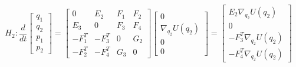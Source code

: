 \documentclass{article}
\begin{document}
\[
H_2 : \frac{d}{dt}
\left[
\begin{array}{ccc}
q_1 \\
q_2 \\
p_1 \\
p_2 
\end{array}
\right]
=
\left[
\begin{array}{cclcc}
0 & E_{2} & F_{1} & F_{2} \\
E_3 & 0& F_3 & F_4 \\
-F_1^T & -F_3^T & 0 & G_2 \\
-F_2^T & -F_4^T & G_3 & 0 
\end{array}
\right]
\left[
\begin{array}{ccc}
0\\
\nabla_{q_2} U(q_2)  \\
0 \\
0 
\end{array}
\right]
=
\left[
\begin{array}{ccc}
E_2 \nabla_{q_2} U(q_2)  \\
0 \\
-F_3^T\nabla_{q_2} U(q_2) \\
-F_4^T \nabla_{q_2} U(q_2) 
\end{array}
\right]
\] 
\end{document}
